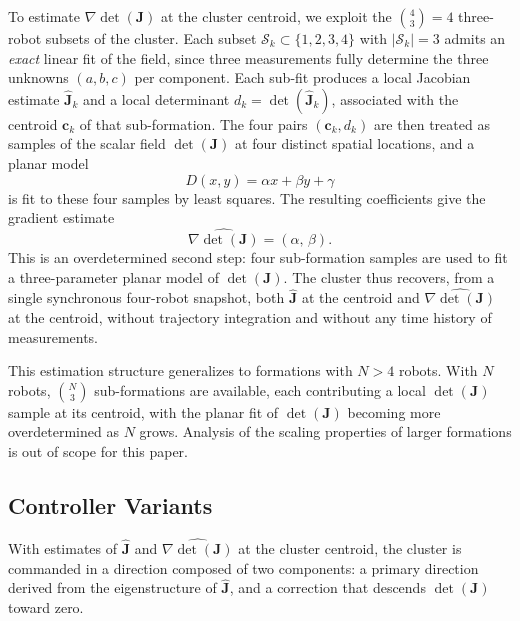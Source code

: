 \documentclass[lettersize,journal]{IEEEtran}
\begin{document}
To estimate $\nabla\det(\mathbf{J})$ at the cluster centroid, we exploit the $\binom{4}{3} = 4$ three-robot subsets of the cluster. Each subset $\mathcal{S}_k \subset \{1,2,3,4\}$ with $|\mathcal{S}_k| = 3$ admits an \emph{exact} linear fit of the field, since three measurements fully determine the three unknowns $(a, b, c)$ per component. Each sub-fit produces a local Jacobian estimate $\hat{\mathbf{J}}_k$ and a local determinant $d_k = \det(\hat{\mathbf{J}}_k)$, associated with the centroid $\mathbf{c}_k$ of that sub-formation. The four pairs $(\mathbf{c}_k, d_k)$ are then treated as samples of the scalar field $\det(\mathbf{J})$ at four distinct spatial locations, and a planar model
\begin{equation}
D(x,y) = \alpha x + \beta y + \gamma
\end{equation}
is fit to these four samples by least squares. The resulting coefficients give the gradient estimate
\begin{equation}
\widehat{\nabla \det(\mathbf{J})} = (\alpha,\, \beta).
\end{equation}
This is an overdetermined second step: four sub-formation samples are used to fit a three-parameter planar model of $\det(\mathbf{J})$. The cluster thus recovers, from a single synchronous four-robot snapshot, both $\hat{\mathbf{J}}$ at the centroid and $\widehat{\nabla\det(\mathbf{J})}$ at the centroid, without trajectory integration and without any time history of measurements.

This estimation structure generalizes to formations with $N > 4$ robots. With $N$ robots, $\binom{N}{3}$ sub-formations are available, each contributing a local $\det(\mathbf{J})$ sample at its centroid, with the planar fit of $\det(\mathbf{J})$ becoming more overdetermined as $N$ grows. Analysis of the scaling properties of larger formations is out of scope for this paper.


\subsection{Controller Variants}

With estimates of $\hat{\mathbf{J}}$ and $\widehat{\nabla\det(\mathbf{J})}$ at the cluster centroid, the cluster is commanded in a direction composed of two components: a primary direction derived from the eigenstructure of $\hat{\mathbf{J}}$, and a correction that descends $\det(\mathbf{J})$ toward zero.
\end{document}
